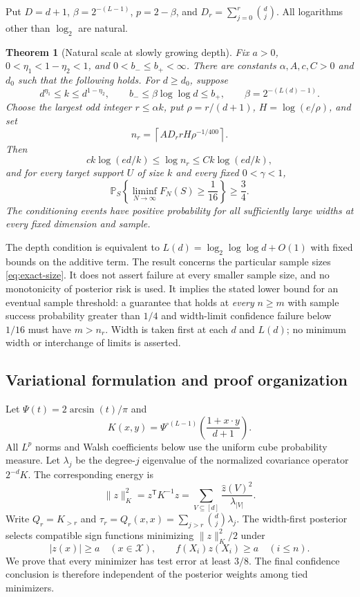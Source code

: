 \documentclass[11pt]{article}
\newtheorem{theorem}{Theorem}[section]
\theoremstyle{remark}\newtheorem{remark}[theorem]{Remark}
\newcommand{\Pp}{\mathbb P}
\begin{document}
Put $D=d+1$, $\beta=2^{-(L-1)}$, $p=2-\beta$, and
$D_r=\sum_{j=0}^r\binom dj$. All logarithms other than $\log_2$ are
natural.

\begin{theorem}[Natural scale at slowly growing depth]\label{thm:main}
Fix $a>0$, $0<\eta_1<1-\eta_2<1$, and $0<b_-\le b_+<\infty$.
There are constants $\alpha,A,c,C>0$ and $d_0$ such that the following
holds. For $d\ge d_0$, suppose
\[
 d^{\eta_1}\le k\le d^{1-\eta_2},\qquad
 b_-\le\beta\log\log d\le b_+,
 \qquad \beta=2^{-(L(d)-1)}.
\]
Choose the largest odd integer $r\le\alpha k$, put
$\rho=r/(d+1)$, $H=\log(e/\rho)$, and set
\begin{equation}\label{eq:exact-size}
 n_r=\left\lceil A D_r rH\rho^{-1/400}\right\rceil.
\end{equation}
Then
\[
 c k\log(ed/k)\le\log n_r\le C k\log(ed/k),
\]
and for every target support $U$ of size $k$ and every fixed
$0<\gamma<1$,
\[
 \Pp_S\left\{\liminf_{N\to\infty}F_N(S)\ge\frac1{16}\right\}
 \ge\frac34.
\]
The conditioning events have positive probability for all sufficiently
large widths at every fixed dimension and sample.
\end{theorem}

The depth condition is equivalent to
$L(d)=\log_2\log\log d+O(1)$ with fixed bounds on the additive term.
The result concerns the particular sample sizes \eqref{eq:exact-size}.
It does not assert failure at every smaller sample size, and no
monotonicity of posterior risk is used. It implies the stated lower
bound for an eventual sample threshold: a guarantee that holds at
\emph{every} $n\ge m$ with sample success probability greater than
$1/4$ and width-limit confidence failure below $1/16$ must have
$m>n_r$. Width is taken first at each $d$ and $L(d)$; no minimum width
or interchange of limits is asserted.

\subsection{Variational formulation and proof organization}
Let $\Psi(t)=2\arcsin(t)/\pi$ and
\[
 K(x,y)=\Psi^{\circ(L-1)}\!\left(\frac{1+x\cdot y}{d+1}\right).
\]
All $L^p$ norms and Walsh coefficients below use the uniform cube
probability measure. Let $\lambda_j$ be the degree-$j$ eigenvalue of
the normalized covariance operator $2^{-d}K$. The corresponding energy
is
\[
 \|z\|_K^2=z^{\mathsf T}K^{-1}z
      =\sum_{V\subseteq[d]}\frac{\widehat z(V)^2}{\lambda_{|V|}}.
\]
Write $Q_r=K_{>r}$ and
$\tau_r=Q_r(x,x)=\sum_{j>r}\binom dj\lambda_j$.
The width-first posterior selects compatible sign functions minimizing
$\|z\|_K^2/2$ under
\begin{equation}\label{eq:obstacle}
 |z(x)|\ge a\quad(x\in\mathcal X),\qquad
 f(X_i)z(X_i)\ge a\quad(i\le n).
\end{equation}
We prove that every minimizer has test error at least $3/8$. The final
confidence conclusion is therefore independent of the posterior weights
among tied minimizers.
\end{document}
